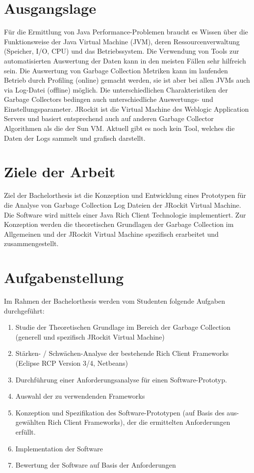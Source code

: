 \section{Ausgangslage}
Für die Ermittlung von Java Performance-Problemen braucht es Wissen über die Funktionsweise der Java Virtual Machine (JVM), deren Ressourcenverwaltung (Speicher, I/O, CPU) und das Betriebssystem. Die Verwendung von Tools zur automatisierten Auswertung der Daten kann in den meisten Fällen sehr hilfreich sein. 
Die Auswertung von Garbage Collection Metriken kann im laufenden Betrieb durch Profiling (online) gemacht werden, sie ist aber bei allen JVMs auch via Log-Datei (offline) möglich. Die unterschiedlichen Charakteristiken der Garbage Collectors bedingen auch unterschiedliche Auswertungs- und Einstellungsparameter. 
JRockit ist die Virtual Machine des Weblogic Application Servers und basiert entsprechend auch auf anderen Garbage Collector Algorithmen als die der Sun VM. Aktuell gibt es noch kein Tool, welches die Daten der Logs sammelt und grafisch darstellt.


\section{Ziele der Arbeit}
Ziel der Bachelorthesis ist die Konzeption und Entwicklung eines Prototypen für die Analyse von Garbage Collection Log Dateien der JRockit Virtual Machine. Die Software wird mittels einer Java Rich Client Technologie implementiert. Zur Konzeption werden die theoretischen Grundlagen der Garbage Collection im Allgemeinen und der JRockit Virtual Machine spezifisch erarbeitet und zusammengestellt.

\section{Aufgabenstellung}
Im Rahmen der Bachelorthesis werden vom Studenten folgende Aufgaben durchgeführt:

\begin{enumerate}
\item Studie der Theoretischen Grundlage im Bereich der Garbage Collection 
    (generell und spezifisch JRockit Virtual Machine)
\item Stärken- / Schwächen-Analyse der bestehende Rich Client Frameworks
    (Eclipse RCP Version 3/4, Netbeans)
\item Durchführung einer Anforderungsanalyse für einen Software-Prototyp.
\item Auswahl der zu verwendenden Frameworks
\item Konzeption und Spezifikation des Software-Prototypen (auf Basis des aus-
    gewählten Rich Client Frameworks), der die ermittelten Anforderungen erfüllt.  
\item Implementation der Software
\item Bewertung der Software auf Basis der Anforderungen
\end{enumerate}


